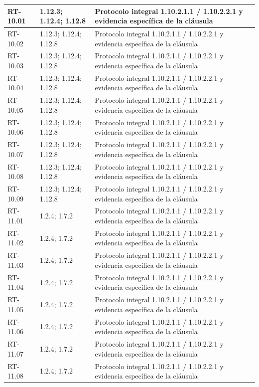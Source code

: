 \begin{longtable}{L{23mm}L{46mm}L{72mm}}
RT-10.01 & 1.12.3; 1.12.4; 1.12.8 & Protocolo integral 1.10.2.1.1 / 1.10.2.2.1 y evidencia específica de la cláusula\\\hline
RT-10.02 & 1.12.3; 1.12.4; 1.12.8 & Protocolo integral 1.10.2.1.1 / 1.10.2.2.1 y evidencia específica de la cláusula\\\hline
RT-10.03 & 1.12.3; 1.12.4; 1.12.8 & Protocolo integral 1.10.2.1.1 / 1.10.2.2.1 y evidencia específica de la cláusula\\\hline
RT-10.04 & 1.12.3; 1.12.4; 1.12.8 & Protocolo integral 1.10.2.1.1 / 1.10.2.2.1 y evidencia específica de la cláusula\\\hline
RT-10.05 & 1.12.3; 1.12.4; 1.12.8 & Protocolo integral 1.10.2.1.1 / 1.10.2.2.1 y evidencia específica de la cláusula\\\hline
RT-10.06 & 1.12.3; 1.12.4; 1.12.8 & Protocolo integral 1.10.2.1.1 / 1.10.2.2.1 y evidencia específica de la cláusula\\\hline
RT-10.07 & 1.12.3; 1.12.4; 1.12.8 & Protocolo integral 1.10.2.1.1 / 1.10.2.2.1 y evidencia específica de la cláusula\\\hline
RT-10.08 & 1.12.3; 1.12.4; 1.12.8 & Protocolo integral 1.10.2.1.1 / 1.10.2.2.1 y evidencia específica de la cláusula\\\hline
RT-10.09 & 1.12.3; 1.12.4; 1.12.8 & Protocolo integral 1.10.2.1.1 / 1.10.2.2.1 y evidencia específica de la cláusula\\\hline
RT-11.01 & 1.2.4; 1.7.2 & Protocolo integral 1.10.2.1.1 / 1.10.2.2.1 y evidencia específica de la cláusula\\\hline
RT-11.02 & 1.2.4; 1.7.2 & Protocolo integral 1.10.2.1.1 / 1.10.2.2.1 y evidencia específica de la cláusula\\\hline
RT-11.03 & 1.2.4; 1.7.2 & Protocolo integral 1.10.2.1.1 / 1.10.2.2.1 y evidencia específica de la cláusula\\\hline
RT-11.04 & 1.2.4; 1.7.2 & Protocolo integral 1.10.2.1.1 / 1.10.2.2.1 y evidencia específica de la cláusula\\\hline
RT-11.05 & 1.2.4; 1.7.2 & Protocolo integral 1.10.2.1.1 / 1.10.2.2.1 y evidencia específica de la cláusula\\\hline
RT-11.06 & 1.2.4; 1.7.2 & Protocolo integral 1.10.2.1.1 / 1.10.2.2.1 y evidencia específica de la cláusula\\\hline
RT-11.07 & 1.2.4; 1.7.2 & Protocolo integral 1.10.2.1.1 / 1.10.2.2.1 y evidencia específica de la cláusula\\\hline
RT-11.08 & 1.2.4; 1.7.2 & Protocolo integral 1.10.2.1.1 / 1.10.2.2.1 y evidencia específica de la cláusula\\\hline

\end{longtable}
